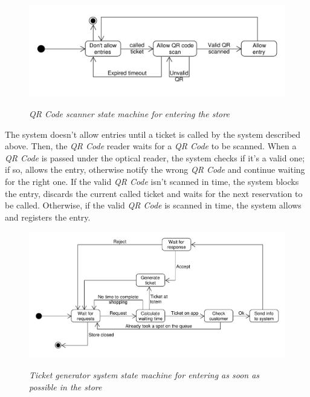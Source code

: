\documentclass{article}
\begin{document}
		\begin{figure}[!h]
			
			\centering
			\hspace*{-0.0cm}\includegraphics[scale=0.54]{StateCharts/qr_scanner_uml.pdf} \\
			\caption{\emph{QR Code scanner state machine for entering the store}}
			
		\end{figure}
		
		The system doesn't allow entries until a ticket is called by the system described above. Then, the \emph{QR Code} reader waits for a \emph{QR Code} to be scanned. When a \emph{QR Code} is passed under the optical reader, the system checks if it's a valid one; if so, allows the entry, otherwise notify the wrong \emph{QR Code} and continue waiting for the right one. If the valid \emph{QR Code} isn't scanned in time, the system blocks the entry, discards the current called ticket and waits for the next reservation to be called. Otherwise, if the valid \emph{QR Code} is scanned in time, the system allows and registers the entry.
		
		\bigskip
		
		\begin{figure}[!h]
			
			\centering
			\hspace*{-1.9cm}\includegraphics[scale=0.55]{StateCharts/ticket_generation_system.pdf} \\
			\caption{\emph{Ticket generator system state machine for entering as soon as possible in the store}}
			
		\end{figure}
	
\end{document}
